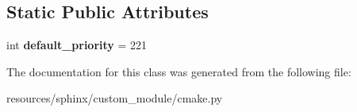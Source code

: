 \subsection*{Static Public Attributes}
\begin{DoxyCompactItemize}
\item 
\mbox{\label{classcmake_1_1CMakeXRefTransform_ab2b872ed2d2e4d99bb3b50ae528c7955}} 
int {\bfseries default\+\_\+priority} = 221
\end{DoxyCompactItemize}


The documentation for this class was generated from the following file\+:\begin{DoxyCompactItemize}
\item 
resources/sphinx/custom\+\_\+module/cmake.\+py\end{DoxyCompactItemize}
